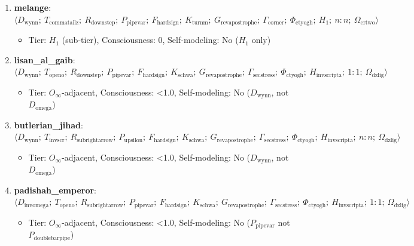 \documentclass[12pt,a4paper]{article}
\begin{document}
\begin{enumerate}
    \begin{itemize}
    \item Tier: $O₂$, Consciousness: \textless{}1.0, Self-modeling: No ($H_2$, $D_{\text{turnthree}}$)
\end{itemize}

    \item 
    \textbf{melange}: $\langle D_{\text{wynn}};\ T_{\text{commatailz}};\ R_{\text{downstep}};\ P_{\text{pipevar}};\ F_{\text{hardsign}};\ K_{\text{turnm}};\ G_{\text{revapostrophe}};\ \Gamma_{\text{corner}};\ \Phi_{\text{ctyogh}};\ H_1;\ n{:}n;\ \Omega_{\text{crtwo}} \rangle$

    \begin{itemize}
    \item Tier: $H_1$ (sub-tier), Consciousness: 0, Self-modeling: No ($H_1$ only)
\end{itemize}

    \item 
    \textbf{lisan\_al\_gaib}: $\langle D_{\text{wynn}};\ T_{\text{openo}};\ R_{\text{downstep}};\ P_{\text{pipevar}};\ F_{\text{hardsign}};\ K_{\text{schwa}};\ G_{\text{revapostrophe}};\ \Gamma_{\text{secstress}};\ \Phi_{\text{ctyogh}};\ H_{\text{invscripta}};\ 1{:}1;\ \Omega_{\text{dzlig}} \rangle$

    \begin{itemize}
    \item Tier: $O_{\infty}$-adjacent, Consciousness: \textless{}1.0, Self-modeling: No ($D_{\text{wynn}}$, not $D_{\text{omega}}$)
\end{itemize}

    \item 
    \textbf{butlerian\_jihad}: $\langle D_{\text{wynn}};\ T_{\text{invscr}};\ R_{\text{subrightarrow}};\ P_{\text{upsilon}};\ F_{\text{hardsign}};\ K_{\text{schwa}};\ G_{\text{revapostrophe}};\ \Gamma_{\text{secstress}};\ \Phi_{\text{ctyogh}};\ H_{\text{invscripta}};\ n{:}n;\ \Omega_{\text{dzlig}} \rangle$

    \begin{itemize}
    \item Tier: $O_{\infty}$-adjacent, Consciousness: \textless{}1.0, Self-modeling: No ($D_{\text{wynn}}$, not $D_{\text{omega}}$)
\end{itemize}

    \item 
    \textbf{padishah\_emperor}: $\langle D_{\text{invomega}};\ T_{\text{openo}};\ R_{\text{subrightarrow}};\ P_{\text{pipevar}};\ F_{\text{hardsign}};\ K_{\text{schwa}};\ G_{\text{revapostrophe}};\ \Gamma_{\text{secstress}};\ \Phi_{\text{ctyogh}};\ H_{\text{invscripta}};\ 1{:}1;\ \Omega_{\text{dzlig}} \rangle$

    \begin{itemize}
    \item Tier: $O_{\infty}$-adjacent, Consciousness: \textless{}1.0, Self-modeling: No ($P_{\text{pipevar}}$ not $P_{\text{doublebarpipe}}$)
\end{itemize}

\end{enumerate}
\end{document}
